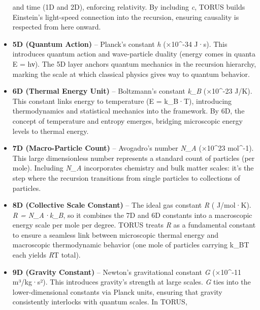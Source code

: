 \documentclass[
]{article}
\begin{document}
\begin{itemize}
  and time (1D and 2D), enforcing relativity. By including \emph{c},
  TORUS builds Einstein's light-speed connection into the recursion,
  ensuring causality is respected from here onward.
\item
  \textbf{5D (Quantum Action)} -- Planck's constant \emph{h} (×10\^{}-34 J·s)\hspace{0pt}. This introduces quantum action and
  wave-particle duality (energy comes in quanta E = hν). The 5D layer
  anchors quantum mechanics in the recursion hierarchy, marking the
  scale at which classical physics gives way to quantum behavior.
\item
  \textbf{6D (Thermal Energy Unit)} -- Boltzmann's constant
  \emph{k_{B}{}} (×10\^{}-23 J/K)\hspace{0pt}. This constant links energy to
  temperature (E =
  k_{B}·T), introducing
  thermodynamics and statistical mechanics into the framework. By 6D,
  the concept of temperature and entropy emerges, bridging microscopic
  energy levels to thermal energy.
\item
  \textbf{7D (Macro-Particle Count)} -- Avogadro's number
  \emph{N_{A}{}} (×10\^{}23 mol\^{}-1)\hspace{0pt}. This large dimensionless number
  represents a standard count of particles (per mole). Including
  \emph{N_{A}{}}
  incorporates chemistry and bulk matter scales: it's the step where the
  recursion transitions from single particles to collections of
  particles.
\item
  \textbf{8D (Collective Scale Constant)} -- The ideal gas constant
  \emph{R} ( J/mol·K)\hspace{0pt}. \emph{R =
  N_{A}·k_{B}{}},
  so it combines the 7D and 6D constants into a macroscopic energy scale
  per mole per degree\hspace{0pt}. TORUS treats \emph{R} as a
  fundamental constant to ensure a seamless link between microscopic
  thermal energy and macroscopic thermodynamic behavior (one mole of
  particles carrying
  k_{B}T each yields
  \emph{R}T total)\hspace{0pt}.
\item
  \textbf{9D (Gravity Constant)} -- Newton's gravitational constant
  \emph{G} (×10\^{}-11 m³/kg·s²)\hspace{0pt}. This introduces
  gravity's strength at large scales. \emph{G} ties into the
  lower-dimensional constants via Planck units, ensuring that gravity
  consistently interlocks with quantum scales\hspace{0pt}. In TORUS,

\end{itemize}
\end{document}
